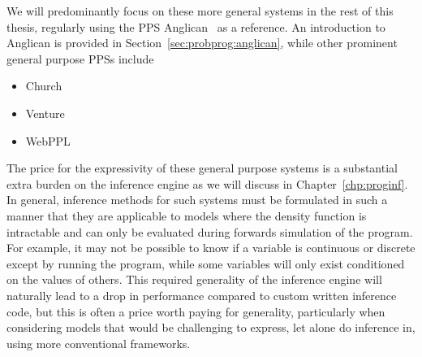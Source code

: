We will predominantly focus on these more general systems in the rest of this thesis,
regularly using the PPS Anglican~\citep{wood2014new} as a reference.  An introduction
to Anglican is provided in Section~\ref{sec:probprog:anglican}, while other prominent
general purpose PPSs include
\begin{itemize}
\item Church \citep{goodman_uai_2008}
\item Venture \citep{mansinghka2014venture}
\item WebPPL \citep{goodman_book_2014}
\end{itemize}

The price for the expressivity of these general purpose systems is a substantial extra 
burden on the inference engine as we will
discuss in Chapter~\ref{chp:proginf}.  In general, inference methods for such systems 
must be formulated in such a manner that they are applicable to models where the 
density function is intractable and can only be evaluated during forwards simulation of the program. 
For example, it may not be possible to know if a variable is continuous or discrete except by
running the program, while some variables will only exist conditioned on the values of others.
This required generality of the inference engine will naturally lead to a drop in performance compared to
custom written inference code, but this is often a price worth paying for generality, particularly
when considering models that would be challenging to express, let alone do inference in, using more
conventional frameworks.